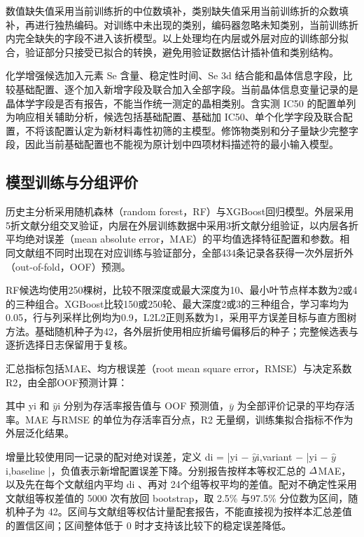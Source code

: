 数值缺失值采用当前训练折的中位数填补，类别缺失值采用当前训练折的众数填补，再进行独热编码。对训练中未出现的类别，编码器忽略未知类别，当前训练折内完全缺失的字段不进入该折模型。以上处理均在内层或外层对应的训练部分拟合，验证部分只接受已拟合的转换，避免用验证数据估计插补值和类别结构。

化学增强候选加入元素 Se 含量、稳定性时间、Se 3d 结合能和晶体信息字段，比较基础配置、逐个加入新增字段及联合加入全部字段。当前晶体信息变量记录的是晶体学字段是否有报告，不能当作统一测定的晶相类别。含实测 IC50 的配置单列为响应相关辅助分析，候选包括基础配置、基础加 IC50、单个化学字段及联合配置，不将该配置认定为新材料毒性初筛的主模型。修饰物类别和分子量缺少完整字段，因此当前基础配置也不能视为原计划中四项材料描述符的最小输入模型。

\subsection{模型训练与分组评价}

历史主分析采用随机森林（random forest，RF）\cite{breiman2001random}与XGBoost\cite{chen2016xgboost}回归模型。外层采用5折文献分组交叉验证，内层在外层训练数据中采用3折文献分组验证，以内层各折平均绝对误差（mean absolute error，MAE）的平均值选择特征配置和参数。相同文献组不同时出现在对应训练与验证部分，全部434条记录各获得一次外层折外（out-of-fold，OOF）预测。

RF候选均使用250棵树，比较不限深度或最大深度为10、最小叶节点样本数为2或4的三种组合。XGBoost比较150或250轮、最大深度2或3的三种组合，学习率均为0.05，行与列采样比例均为0.9，L2L2\hspace{0pt}正则系数为1，采用平方误差目标与直方图树方法。基础随机种子为42，各外层折使用相应折编号偏移后的种子；完整候选表与逐折选择日志保留用于复核。

汇总指标包括MAE、均方根误差（root mean square error，RMSE）与决定系数\nobreakspace{}R2，由全部OOF预测计算：

其中 yi 和 \ensuremath{\hat{y}}i 分别为存活率报告值与 OOF 预测值，\ensuremath{\bar{y}} 为全部评价记录的平均存活率。MAE 与RMSE 的单位为存活率百分点，R2 无量纲，训练集拟合指标不作为外层泛化结果。

增量比较使用同一记录的配对绝对误差，定义 di = |yi \ensuremath{\mathord{-}} \ensuremath{\hat{y}}i,variant \ensuremath{\mathord{-}} |yi \ensuremath{\mathord{-}} \ensuremath{\hat{y}}i,baseline |，负值表示新增配置误差下降。分别报告按样本等权汇总的 \ensuremath{\mathnormal{\Delta}}MAE，以及先在每个文献组内平均 di 、再对 24个组等权平均的差值。配对不确定性采用文献组等权差值的 5000 次有放回 bootstrap，取 2.5\% 与97.5\% 分位数为区间，随机种子为 42。区间与文献组等权估计量配套报告，不能直接视为按样本汇总差值的置信区间；区间整体低于 0 时才支持该比较下的稳定误差降低。

